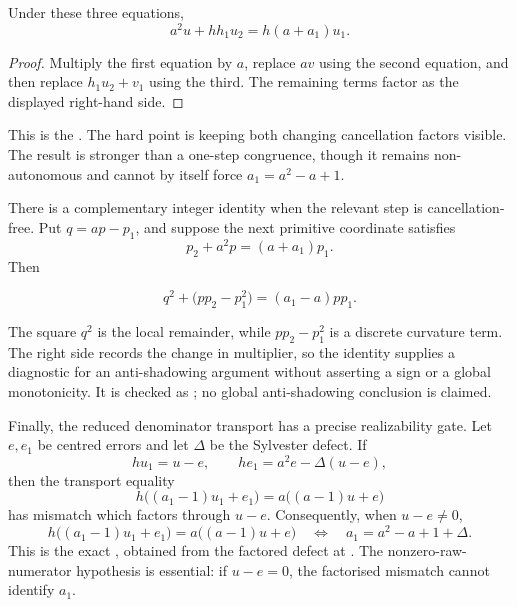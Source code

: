 \documentclass[11pt]{article}
\begin{document}
\begin{theorem}\label{res:secondorder}
Under these three equations,
\[
 a^2u+hh_1u_2=h(a+a_1)u_1.
\]
\end{theorem}

\begin{proof}
Multiply the first equation by $a$, replace $av$ using the second equation,
and then replace $h_1u_2+v_1$ using the third.  The remaining terms factor as
the displayed right-hand side.
\end{proof}

\noindent This is the
.  The hard point is keeping both changing cancellation
factors visible.  The result is stronger than a one-step congruence, though it
remains non-autonomous and cannot by itself force $a_1=a^2-a+1$.

There is a complementary integer identity when the relevant step is
cancellation-free.  Put $q=ap-p_1$, and suppose the next primitive coordinate
satisfies
\[
 p_2+a^2p=(a+a_1)p_1.
\]
Then
\begin{theorem}\label{res:curvature}
\[
 q^2+\bigl(pp_2-p_1^2\bigr)=(a_1-a)pp_1.
\]
\end{theorem}

The square $q^2$ is the local remainder, while $pp_2-p_1^2$ is a discrete
curvature term.  The right side records the change in multiplier, so the
identity supplies a diagnostic for an anti-shadowing argument without
asserting a sign or a global monotonicity.  It is checked as
; no global anti-shadowing conclusion is
claimed.

Finally, the reduced denominator transport has a precise realizability gate.
Let $e,e_1$ be centred errors and let $\Delta$ be the Sylvester defect.  If
\[
 hu_1=u-e,
 \qquad he_1=a^2e-\Delta(u-e),
\]
then the transport equality
\[
 h\bigl((a_1-1)u_1+e_1\bigr)
   =a\bigl((a-1)u+e\bigr)
\]
has mismatch which factors through $u-e$.  Consequently, when $u-e\ne0$,
\[
 h\bigl((a_1-1)u_1+e_1\bigr)
   =a\bigl((a-1)u+e\bigr)
 \quad\Longleftrightarrow\quad
 a_1=a^2-a+1+\Delta.
\]
This is the exact
, obtained from the factored defect at
.  The nonzero-raw-numerator hypothesis is essential: if
$u-e=0$, the factorised mismatch cannot identify $a_1$.
\end{document}
